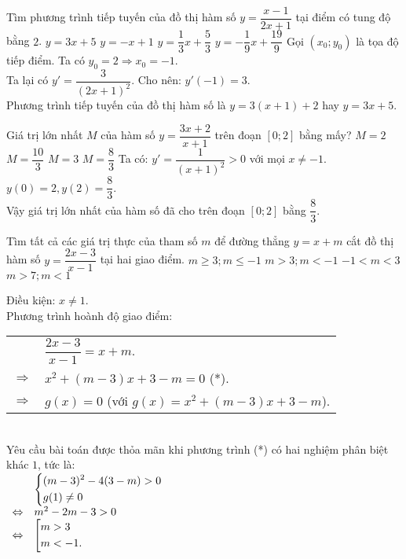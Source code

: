 \begin{ex}%
Tìm phương trình tiếp tuyến của đồ thị hàm số $y = \dfrac{x-1}{2x+1}$ tại điểm có tung độ bằng $2$.
 \choice
  { \True $y = 3x+5$}
  { $y = -x+1$}
  { $y = \dfrac{1}{3}x + \dfrac{5}{3}$}
  { $y = -\dfrac{1}{9}x + \dfrac{19}{9}$}
 \loigiai
  {
  Gọi $(x_0; y_0)$ là tọa độ tiếp điểm. Ta có $y_0 = 2 \Rightarrow x_0 = -1$.\\
  Ta lại có $y' = \dfrac{3}{(2x+1)^2}$. Cho nên: $y'(-1) = 3$.\\
  Phương trình tiếp tuyến của đồ thị hàm số là $y = 3(x+1)+2$ hay $y = 3x+5$.
  }
\end{ex}


\begin{ex}%
Giá trị lớn nhất $M$ của hàm số $y = \dfrac{3x+2}{x+1}$ trên đoạn $\left[0;2\right]$ bằng mấy?
 \choice
  { $M = 2$}
  { $M = \dfrac{10}{3}$}
  { $M = 3$}
  { \True $M = \dfrac{8}{3}$}
 \loigiai
  {
  Ta có: $y' = \dfrac{1}{(x+1)^2} > 0$ với mọi $x \ne -1$.\\
  $y(0) = 2, y(2) = \dfrac{8}{3}$.\\
  Vậy giá trị lớn nhất của hàm số đã cho trên đoạn $\left[0;2\right]$ bằng $\dfrac{8}{3}$.
  }
\end{ex}


\begin{ex}%
Tìm tất cả các giá trị thực của tham số $m$ để đường thẳng $y = x+m$ cắt đồ thị hàm số $y = \dfrac{2x-3}{x-1}$ tại hai giao điểm.
 \choice
  { $m \geq 3; m \leq -1$}
  { \True $m > 3; m < -1$}
  { $-1 < m < 3$}
  { $m > 7; m < 1$}
 \loigiai
  {
  Điều kiện: $x \neq 1$.\\
  Phương trình hoành độ giao điểm:\\
  \begin{tabular}{ll}
    			  & $\dfrac{2x-3}{x-1} = x+m$.\\
    $\Rightarrow$ & $x^2 + (m-3)x + 3-m = 0$\hspace{1cm} (*).\\
    $\Rightarrow$ & $g(x) = 0$ (với $g(x) =  x^2 + (m-3)x + 3-m$).
  \end{tabular}\\
  Yêu cầu bài toán được thỏa mãn khi phương trình (*) có hai nghiệm phân biệt khác $1$, tức là:\\
  $\begin{array}{ll}
  				  & \left\{\begin{aligned}& (m-3)^2 -4(3-m) >0 \\& g(1) \ne 0\end{aligned}\right.\\
  \Leftrightarrow & m^2 -2m -3 >0\\
  \Leftrightarrow & \left[\begin{aligned}& m>3 \\& m<-1.\end{aligned}\right.
  \end{array}$
  }
\end{ex}


